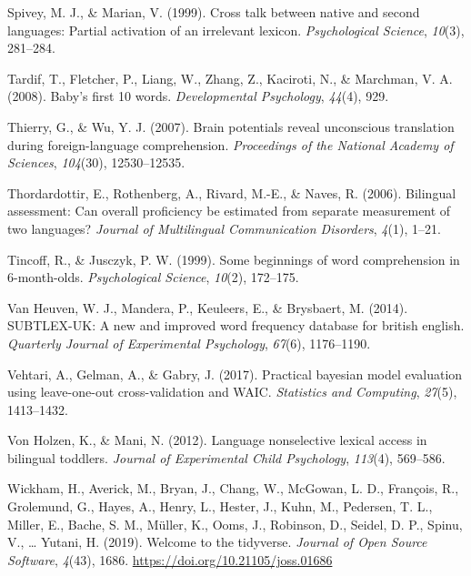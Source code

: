 \documentclass[
  letterpaper,
  DIV=11,
  numbers=noendperiod]{scrartcl}
\newlength{\cslhangindent}
\newlength{\cslentryspacingunit} %
\newenvironment{CSLReferences}[2] %
 {%
  \setlength{\parindent}{0pt}
  \ifodd #1
  \let\oldpar\par
  \def\par{\hangindent=\cslhangindent\oldpar}
  \fi
  \setlength{\parskip}{#2\cslentryspacingunit}
 }%
 {}
\begin{document}
\begin{CSLReferences}{1}{0}
\leavevmode{}%
Spivey, M. J., \& Marian, V. (1999). Cross talk between native and
second languages: Partial activation of an irrelevant lexicon.
\emph{Psychological Science}, \emph{10}(3), 281--284.

\leavevmode{}%
Tardif, T., Fletcher, P., Liang, W., Zhang, Z., Kaciroti, N., \&
Marchman, V. A. (2008). Baby's first 10 words. \emph{Developmental
Psychology}, \emph{44}(4), 929.

\leavevmode{}%
Thierry, G., \& Wu, Y. J. (2007). Brain potentials reveal unconscious
translation during foreign-language comprehension. \emph{Proceedings of
the National Academy of Sciences}, \emph{104}(30), 12530--12535.

\leavevmode{}%
Thordardottir, E., Rothenberg, A., Rivard, M.-E., \& Naves, R. (2006).
Bilingual assessment: Can overall proficiency be estimated from separate
measurement of two languages? \emph{Journal of Multilingual
Communication Disorders}, \emph{4}(1), 1--21.

\leavevmode{}%
Tincoff, R., \& Jusczyk, P. W. (1999). Some beginnings of word
comprehension in 6-month-olds. \emph{Psychological Science},
\emph{10}(2), 172--175.

\leavevmode{}%
Van Heuven, W. J., Mandera, P., Keuleers, E., \& Brysbaert, M. (2014).
SUBTLEX-UK: A new and improved word frequency database for british
english. \emph{Quarterly Journal of Experimental Psychology},
\emph{67}(6), 1176--1190.

\leavevmode{}%
Vehtari, A., Gelman, A., \& Gabry, J. (2017). Practical bayesian model
evaluation using leave-one-out cross-validation and WAIC.
\emph{Statistics and Computing}, \emph{27}(5), 1413--1432.

\leavevmode{}%
Von Holzen, K., \& Mani, N. (2012). Language nonselective lexical access
in bilingual toddlers. \emph{Journal of Experimental Child Psychology},
\emph{113}(4), 569--586.

\leavevmode{}%
Wickham, H., Averick, M., Bryan, J., Chang, W., McGowan, L. D.,
François, R., Grolemund, G., Hayes, A., Henry, L., Hester, J., Kuhn, M.,
Pedersen, T. L., Miller, E., Bache, S. M., Müller, K., Ooms, J.,
Robinson, D., Seidel, D. P., Spinu, V., \ldots{} Yutani, H. (2019).
Welcome to the {tidyverse}. \emph{Journal of Open Source Software},
\emph{4}(43), 1686. \url{https://doi.org/10.21105/joss.01686}


\end{CSLReferences}
\end{document}
